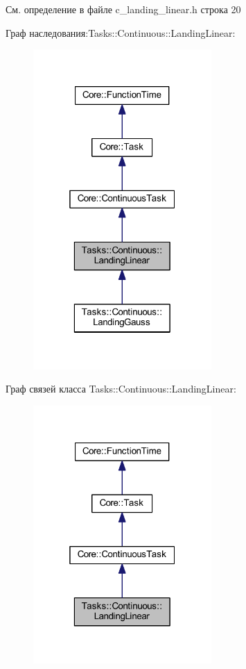 См. определение в файле c\+\_\+landing\+\_\+linear.\+h строка 20



Граф наследования\+:Tasks\+:\+:Continuous\+:\+:Landing\+Linear\+:\nopagebreak
\begin{figure}[H]
\begin{center}
\leavevmode
\includegraphics[width=193pt]{class_tasks_1_1_continuous_1_1_landing_linear__inherit__graph}
\end{center}
\end{figure}


Граф связей класса Tasks\+:\+:Continuous\+:\+:Landing\+Linear\+:\nopagebreak
\begin{figure}[H]
\begin{center}
\leavevmode
\includegraphics[width=193pt]{class_tasks_1_1_continuous_1_1_landing_linear__coll__graph}
\end{center}
\end{figure}



